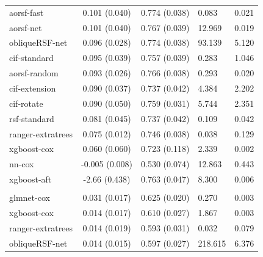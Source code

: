 \documentclass[twoside,11pt]{article}\usepackage[]{graphicx}\usepackage[]{xcolor}
\newenvironment{knitrout}{}{} %
\begin{document}
\begin{knitrout}
\begin{longtable}[t]{lcclc}
\hspace{1em}aorsf-fast & 0.101 (0.040) & 0.774 (0.038) & 0.083 & 0.021\\
\hspace{1em}aorsf-net & 0.101 (0.040) & 0.767 (0.039) & 12.969 & 0.019\\
\hspace{1em}obliqueRSF-net & 0.096 (0.028) & 0.774 (0.038) & 93.139 & 5.120\\
\hspace{1em}cif-standard & 0.095 (0.039) & 0.757 (0.039) & 0.283 & 1.046\\
\hspace{1em}aorsf-random & 0.093 (0.026) & 0.766 (0.038) & 0.293 & 0.020\\
\hspace{1em}cif-extension & 0.090 (0.037) & 0.737 (0.042) & 4.384 & 2.202\\
\hspace{1em}cif-rotate & 0.090 (0.050) & 0.759 (0.031) & 5.744 & 2.351\\
\hspace{1em}rsf-standard & 0.081 (0.045) & 0.737 (0.042) & 0.109 & 0.042\\
\hspace{1em}ranger-extratrees & 0.075 (0.012) & 0.746 (0.038) & 0.038 & 0.129\\
\hspace{1em}xgboost-cox & 0.060 (0.060) & 0.723 (0.118) & 2.339 & 0.002\\
\hspace{1em}nn-cox & -0.005 (0.008) & 0.530 (0.074) & 12.863 & 0.443\\
\hspace{1em}xgboost-aft & -2.66 (0.438) & 0.763 (0.047) & 8.300 & 0.006\\
\addlinespace[0.3em]
\hline
\multicolumn{5}{l}{\textit{\textbf{FCL; relapse, n = 541, p = 7}}}\\
\hline
\hspace{1em}glmnet-cox & 0.031 (0.017) & 0.625 (0.020) & 0.270 & 0.003\\
\hspace{1em}xgboost-cox & 0.014 (0.017) & 0.610 (0.027) & 1.867 & 0.003\\
\hspace{1em}ranger-extratrees & 0.014 (0.019) & 0.593 (0.031) & 0.032 & 0.079\\
\hspace{1em}obliqueRSF-net & 0.014 (0.015) & 0.597 (0.027) & 218.615 & 6.376\\

\end{longtable}
\end{knitrout}
\end{document}
